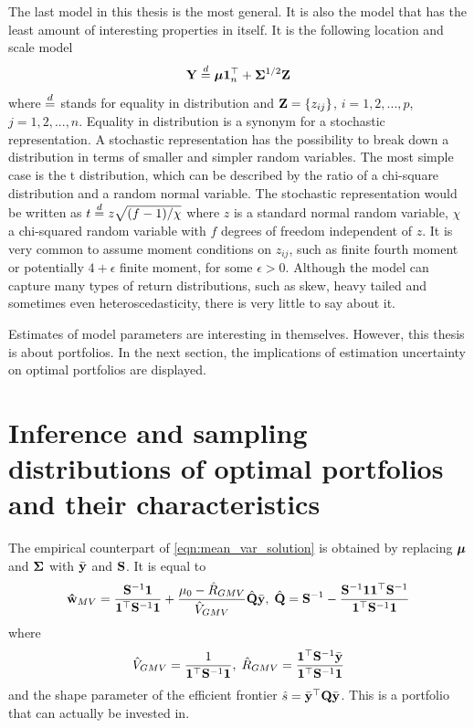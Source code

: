 \documentclass[12pt, oneside]{book}\usepackage{knitr}
\begin{document}
The last model in this thesis is the most general.
It is also the model that has the least amount of interesting properties in itself.
It is the following location and scale model
\begin{equation}\label{eqn:location_scale_model}
\mathbf{Y} \stackrel{d}{=} \mbox{\boldmath$\mu$} \mathbf{1}^\top_n + \mathbf{\Sigma}^{1/2} \mathbf{Z}
\end{equation}
where $\stackrel{d}{=}$ stands for equality in distribution  and $\mathbf{Z} = \{z_{ij}\}$, $i=1,2,...,p$, $j=1,2,...,n$.
Equality in distribution is a synonym for a stochastic representation.
A stochastic representation has the possibility to break down a distribution in terms of smaller and simpler random variables. 
The most simple case is the t distribution, which can be described by the ratio of a chi-square distribution and a random normal variable.
The stochastic representation would be written as $t \stackrel{d}{=} z \sqrt{(f-1)/\chi}$ where $z$ is a standard normal random variable, $\chi$ a chi-squared random variable with $f$ degrees of freedom independent of $z$.
It is very common to assume moment conditions on $z_{ij}$, such as finite fourth moment or potentially $4+\epsilon$ finite moment, for some $\epsilon>0$.
Although the model can capture many types of return distributions, such as skew, heavy tailed and sometimes even heteroscedasticity, there is very little to say about it.

Estimates of model parameters are interesting in themselves. 
However, this thesis is about portfolios.
In the next section, the implications of estimation uncertainty on optimal portfolios are displayed.

\section{Inference and sampling distributions of optimal portfolios and their characteristics}
The empirical counterpart of \eqref{eqn:mean_var_solution} is obtained by replacing $\mbox{\boldmath$\mu$}$ and $\mathbf{\Sigma}$ with $\bar{\mathbf{y}}$ and $\mathbf{S}$. It is equal to
\begin{equation}\label{eqn:meanvar_solution_sample}
	\mathbf{\hat{w}}_{MV} = \frac{\mathbf{S}^{-1}\mathbf{1}}{\mathbf{1}^\top \mathbf{S}^{-1}\mathbf{1}} + \frac{\mu_0 - \hat{R}_{GMV}}{\hat{V}_{GMV}} \hat{\mathbf{Q}} \bar{\mathbf{y}},\; \hat{\mathbf{Q}} = \mathbf{S}^{-1} - \frac{\mathbf{S}^{-1} \mathbf{1} \mathbf{1}^\top \mathbf{S}^{-1}}{\mathbf{1}^\top \mathbf{S}^{-1} \mathbf{1}}
\end{equation}
where 
\begin{equation}\label{eqn:meanvar_characteristics_sample}
  \hat{V}_{GMV} = \frac{1}{\mathbf{1}^\top \mathbf{S}^{-1}\mathbf{1}},\; \hat{R}_{GMV} = \frac{\mathbf{1}^\top \mathbf{S}^{-1} \bar{\mathbf{y}}}{\mathbf{1}^\top \mathbf{S}^{-1}\mathbf{1}}
\end{equation}
and the shape parameter of the efficient frontier $\hat{s} = \bar{\mathbf{y}}^\top \mathbf{Q} \bar{\mathbf{y}}$.
This is a portfolio that can actually be invested in. 
\end{document}
